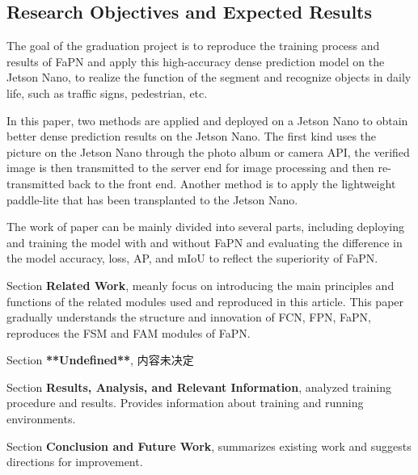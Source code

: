 \subsection{Research Objectives and Expected Results}
The goal of the graduation project is to reproduce the training process and results of FaPN \cite{huang2021fapn} and apply this high-accuracy dense prediction model on the Jetson Nano, to realize the function of the segment and recognize objects in daily life, such as traffic signs, pedestrian, etc.

In this paper, two methods are applied and deployed on a Jetson Nano to obtain better dense prediction results on the Jetson Nano. The first kind uses the picture on the Jetson Nano through the photo album or camera API, the verified image is then transmitted to the server end for image processing and then re-transmitted back to the front end. Another method is to apply the lightweight paddle-lite \cite{paddlelite} that has been transplanted to the Jetson Nano.

The work of paper can be mainly divided into several parts, including deploying and training the model with and without FaPN and evaluating the difference in the model accuracy, loss, AP, and mIoU to reflect the superiority of FaPN.

Section \uppercase\expandafter{} \textbf{Related Work}, meanly focus on introducing the main principles and functions of the related modules used and reproduced in this article. This paper gradually understands the structure and innovation of FCN, FPN, FaPN, reproduces the FSM and FAM modules of FaPN.


Section \uppercase\expandafter{} \textbf{**Undefined**}, 内容未决定


Section \uppercase\expandafter{} \textbf{Results, Analysis, and Relevant Information}, analyzed training procedure and results. Provides information about training and running environments.


Section \uppercase\expandafter{} \textbf{Conclusion and Future Work}, summarizes existing work and suggests directions for improvement.
\clearpage